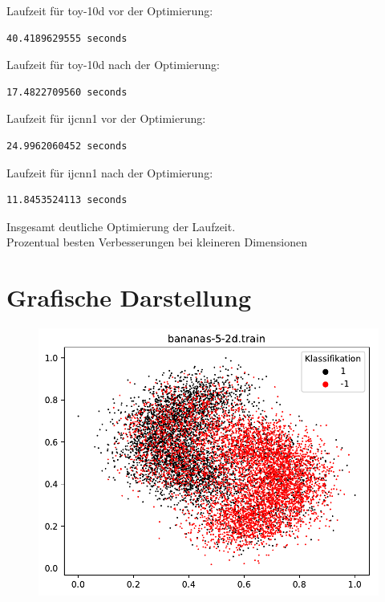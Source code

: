 \documentclass{beamer}
\begin{document}
\begin{frame}[fragile]
Laufzeit für toy-10d vor der Optimierung:
\begin{verbatim}
40.4189629555 seconds
\end{verbatim}
Laufzeit für toy-10d nach der Optimierung:
\begin{verbatim}
17.4822709560 seconds
\end{verbatim}
\end{frame}

\begin{frame}[fragile]
Laufzeit für ijcnn1 vor der Optimierung:
\begin{verbatim}
24.9962060452 seconds
\end{verbatim}
Laufzeit für ijcnn1 nach der Optimierung:
\begin{verbatim}
11.8453524113 seconds
\end{verbatim}
\end{frame}

\begin{frame}
Insgesamt deutliche Optimierung der Laufzeit.\\
Prozentual besten Verbesserungen bei kleineren Dimensionen
\end{frame}

\section{Grafische Darstellung}
\begin{figure}[h]
\centering
\includegraphics[scale=0.7]{bananas-5-2d-train.pdf}
\label{bananas}
\end{figure}
\end{document}
